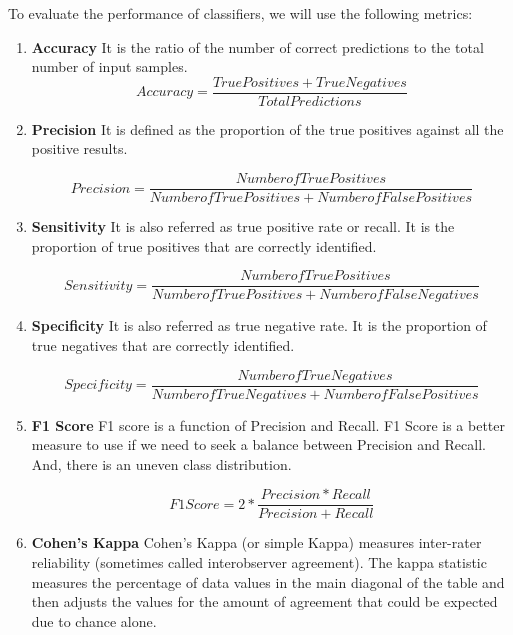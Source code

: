 \documentclass[]{article}
\begin{document}
To evaluate the performance of classifiers, we will use the following
metrics:

\begin{enumerate}
\item \textbf{Accuracy}
It is the ratio of the number of correct predictions to the total number of input samples.
\begin{equation}
Accuracy = \frac{True Positives + True Negatives} {Total Predictions}
\end{equation}

\item \textbf{Precision}
It is defined as the proportion of the true positives against all the positive
results.

\begin{equation}
Precision = \frac{Number of True Positives} {Number of True Positives + Number of False Positives}
\end{equation}

\item \textbf{Sensitivity}
It is also referred as true positive rate or recall. It is the proportion of true positives that are correctly identified.

\begin{equation}
Sensitivity = \frac{Number of True Positives} {Number of True Positives + Number of False Negatives}
\end{equation}


\item \textbf{Specificity}
It is also referred as true negative rate. It is the proportion of true negatives that are
correctly identified.

\begin{equation}
Specificity = \frac{Number of True Negatives} {Number of True Negatives + Number of False Positives}
\end{equation}

\item \textbf{F1 Score}
F1 score is a function of Precision and Recall. F1 Score is a better measure to use if we need to seek a balance between Precision and Recall. And, there is an uneven class distribution.


\begin{equation}
F1 Score = 2 * \frac{Precision * Recall} {Precision + Recall}
\end{equation}

\item \textbf{Cohen's Kappa}
Cohen's Kappa (or simple Kappa) measures inter-rater reliability (sometimes called interobserver agreement). The kappa statistic measures the percentage of data values in the main diagonal of the table and then adjusts the values for the amount of agreement that could be expected due to chance alone.

\end{enumerate}
\end{document}
